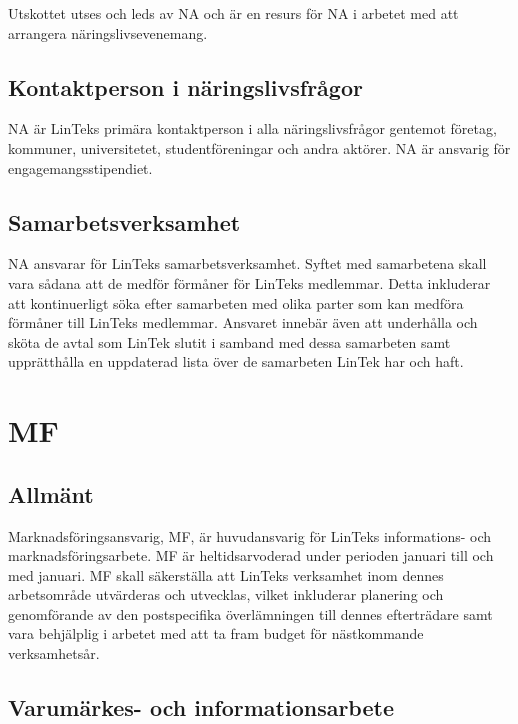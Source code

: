 Utskottet utses och leds av NA och är en resurs för NA i arbetet med att
arrangera näringslivsevenemang.

\hypertarget{kontaktperson-i-nuxe4ringslivsfruxe5gor}{%
\subsection{Kontaktperson i
näringslivsfrågor}\label{kontaktperson-i-nuxe4ringslivsfruxe5gor}}

NA är LinTeks primära kontaktperson i alla näringslivsfrågor gentemot
företag, kommuner, universitetet, studentföreningar och andra aktörer.
NA är ansvarig för engagemangsstipendiet.

\hypertarget{samarbetsverksamhet}{%
\subsection{Samarbetsverksamhet}\label{samarbetsverksamhet}}

NA ansvarar för LinTeks samarbetsverksamhet. Syftet med samarbetena
skall vara sådana att de medför förmåner för LinTeks medlemmar. Detta
inkluderar att kontinuerligt söka efter samarbeten med olika parter som
kan medföra förmåner till LinTeks medlemmar. Ansvaret innebär även att
underhålla och sköta de avtal som LinTek slutit i samband med dessa
samarbeten samt upprätthålla en uppdaterad lista över de samarbeten
LinTek har och haft.

\hypertarget{mf}{%
\section{MF}\label{mf}}

\hypertarget{allmuxe4nt-5}{%
\subsection{Allmänt}\label{allmuxe4nt-5}}

Marknadsföringsansvarig, MF, är huvudansvarig för LinTeks informations-
och marknadsföringsarbete. MF är heltidsarvoderad under perioden januari
till och med januari. MF skall säkerställa att LinTeks verksamhet inom
dennes arbetsområde utvärderas och utvecklas, vilket inkluderar
planering och genomförande av den postspecifika överlämningen till
dennes efterträdare samt vara behjälplig i arbetet med att ta fram
budget för nästkommande verksamhetsår.

\hypertarget{varumuxe4rkes--och-informationsarbete}{%
\subsection{Varumärkes- och
informationsarbete}\label{varumuxe4rkes--och-informationsarbete}}

